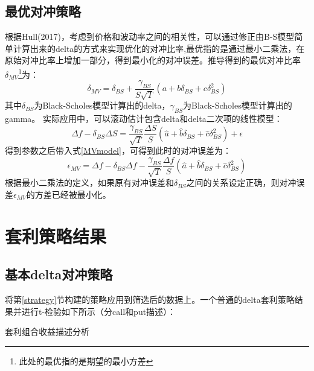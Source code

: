    \subsection{最优对冲策略}\label{optimal_strategy}
    根据Hull(2017)\cite{Hull-2017}，考虑到价格和波动率之间的相关性，可以通过修正由B-S模型简单计算出来的delta的方式来实现优化的对冲比率,最优指的是通过最小二乘法，在原始对冲比率上增加一部分，得到最小化的对冲误差。推导得到的最优对冲比率$\delta_{MV}$\footnote{此处的最优指的是期望的最小方差}为：
    \begin{equation}\label{MVmodel}
        \delta_{MV}=\delta_{BS}+\frac{\gamma_{BS}}{S\sqrt{T}}(a+b\delta_{BS}+c\delta^2_{BS})
    \end{equation}
    其中$\delta_{BS}$为Black-Scholes模型计算出的delta，$\gamma_{BS}$为Black-Scholes模型计算出的gamma。
    实际应用中，可以滚动估计包含delta和delta二次项的线性模型：
    \begin{equation}\label{MVreg}
        \Delta{f}-\delta_{BS}\Delta{S}=\frac{\gamma_{BS}}{\sqrt{T}}\frac{\Delta{S}}{S}(\hat{a}+\hat{b}\delta_{BS}+\hat{c}\delta^2_{BS})+\epsilon
    \end{equation}
    得到参数之后带入式\ref{MVmodel}，可得到此时的对冲误差为：
    \begin{equation}
        \epsilon_{MV}=\Delta{f}-\delta_{BS}\Delta{f}-\frac{\gamma_{BS}}{\sqrt{T}}\frac{\Delta{f}}{S}(\hat{a}+\hat{b}\delta_{BS}+\hat{c}\delta^2_{BS})
    \end{equation}
    根据最小二乘法的定义，如果原有对冲误差和$\delta_{BS}$之间的关系设定正确，则对冲误差$\epsilon_{MV}$的方差已经被最小化。
    
\section{套利策略结果}
\subsection{基本delta对冲策略}
将第\ref{strategy}节构建的策略应用到筛选后的数据上。一个普通的delta套利策略结果并进行t-检验如下所示（分call和put描述）： 
~\\ 
\begin{table}[H]
    \caption{套利组合收益描述分析}
    \centering
    
    
    
\end{table}

